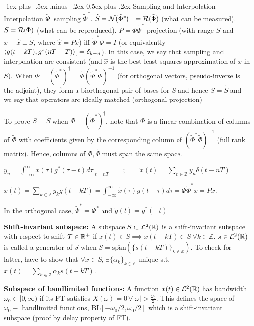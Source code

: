 \documentclass{article}
\makeatletter
\renewcommand{\section}{\@startsection{section}{1}{0mm}%
                                {-1ex plus -.5ex minus -.2ex}%
                                {0.5ex plus .2ex}%
                                {\color{blue!60}\normalfont\normalsize\bfseries}}
\makeatother
\begin{document}
\begin{multicols*}{3}
    \section{Sampling and Interpolation}
    Interpolation $\tilde{\Phi}$, sampling $\tilde{\Phi}^*$. $\tilde{S}=\mathcal{N}(\tilde{\Phi}^*)^\perp=\mathcal{R}(\tilde{\Phi})$ (what can be measured). $S=\mathcal{R}(\Phi)$ (what can be reproduced). $P=\Phi\tilde{\Phi}^*$ projection (with range $S$ and $x-\hat{x}\perp \tilde{S}$, where $\hat{x}=Px$) iff $\tilde{\Phi}^*\Phi =I$ (or equivalently $\left\langle g(t-kT),\tilde{g}^*(nT-T) \right\rangle_t=\delta_{k-n}$). In this case, we say that sampling and interpolation are consistent (and $\hat{x}$ is the best least-squares approximation of $x$ in $S$). When $\Phi=\left(\tilde{\Phi}^*\right)^\dagger=\tilde{\Phi}(\tilde{\Phi}^*\tilde{\Phi})^{-1}$ (for orthogonal vectors, pseudo-inverse is the adjoint), they form a biorthogonal pair of bases for $S$ and hence $S=\tilde{S}$ and we say that operators are ideally matched (orthogonal projection).
    
    To prove $S=\tilde{S}$ when $\Phi=\left(\tilde{\Phi}^*\right)^\dagger$, note that $\Phi$ is a linear combination of columns of $\tilde{\Phi}$ with coefficients given by the corresponding column of $(\tilde{\Phi}^*\tilde{\Phi})^{-1}$ (full rank matrix). Hence, columns of $\Phi,\tilde{\Phi}$ must span the same space.
    
    
    
    $y_n=\int_{-\infty}^\infty x(\tau)g^*(\tau-t)d\tau \Big|_{t=nT}\qquad;\qquad \tilde{x}(t)=\sum_{n\in\mathbb{Z}}y_n\delta(t-nT)$
    
    $\hat{x}(t)=\sum_{k\in\mathbb{Z}}y_k g(t-kT)=\int_{-\infty}^\infty \tilde{x}(\tau)g(t-\tau)d\tau=\Phi\tilde{\Phi}^*x=Px$.
    
    In the orthogonal case, $\tilde{\Phi}^*=\Phi^*$ and $\tilde{g}(t)=g^*(-t)$
    
    \textbf{Shift-invariant subspace: }A subspace $S\subset \mathcal{L}^2(\mathbb{R})$ is a shift-invariant subspace with respect to shift $T\in\mathbb{R}^+$ if $x(t)\in S \implies x(t-kT)\in S \ \forall k\in \mathbb{Z}$. $s\in \mathcal{L}^2(\mathbb{R})$ is called a generator of $S$ when $S=\overline{\text{span}}(\{s(t-kT)\}_{k\in \mathbb{Z}})$. To check for latter, have to show that $\forall x \in S$, $\exists \{\alpha_k\}_{k\in \mathbb{Z}}$ unique s.t. $x(t)=\sum_{k\in \mathbb{Z}}\alpha_k s(t-kT)$.
    
    \textbf{Subspace of bandlimited functions: }A function $x(t)\in\mathcal{L}^2(\mathbb{R})$ has bandwidth $\omega_0\in[0,\infty)$ if its FT satisfies $X(\omega)=0\ \forall |\omega|>\frac{\omega_0}{2}$. This defines the space of $\omega_0-$ bandlimited functions, $\text{BL}[-\omega_0/2,\omega_0/2]$ which is a shift-invariant subspace (proof by delay property of FT).
    

\end{multicols*}
\end{document}
